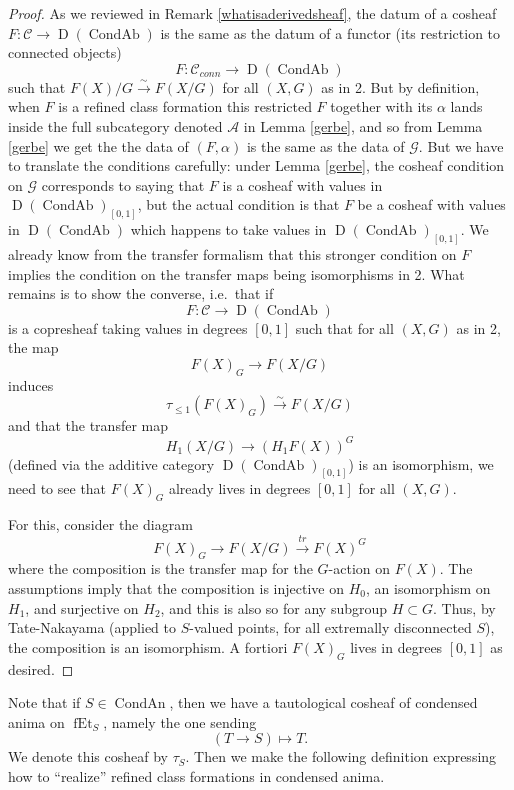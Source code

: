 \documentclass[12pt]{article}
\theoremstyle{definition}
\newcommand{\on}{\operatorname}
\newcommand{\mc}{\mathcal}
\begin{document}
\begin{proof}
As we reviewed in Remark \ref{whatisaderivedsheaf}, the datum of a cosheaf $F:\mc{C} \to \on{D}(\on{CondAb})$ is the same as the datum of a functor (its restriction to connected objects)
$$F:\mc{C}_{conn} \to \on{D}(\on{CondAb})$$
such that $F(X)/G\overset{\sim}{\rightarrow} F(X/G)$ for all $(X,G)$ as in 2.  But by definition, when $F$ is a refined class formation this restricted $F$ together with its $\alpha$ lands inside the full subcategory denoted $\mc{A}$ in Lemma \ref{gerbe}, and so from Lemma \ref{gerbe} we get the the data of $(F,\alpha)$ is the same as the data of $\mc{G}$.  But we have to translate the conditions carefully: under Lemma \ref{gerbe}, the cosheaf condition on $\mc{G}$ corresponds to saying that $F$ is a cosheaf with values in $\on{D}(\on{CondAb})_{[0,1]}$, but the actual condition is that $F$ be a cosheaf with values in $\on{D}(\on{CondAb})$ which happens to take values in $\on{D}(\on{CondAb})_{[0,1]}$.  We already know from the transfer formalism that this stronger condition on $F$ implies the condition on the transfer maps being isomorphisms in 2.  What remains is to show the converse, i.e.\ that if
$$F:\mc{C}\to \on{D}(\on{CondAb})$$
is a copresheaf taking values in degrees $[0,1]$ such that for all $(X,G)$ as in 2, the map
$$F(X)_G \to F(X/G)$$
induces
$$\tau_{\leq 1}(F(X)_G)\overset{\sim}{\rightarrow} F(X/G)$$
and that the transfer map
$$H_1(X/G) \to (H_1F(X))^G$$
(defined via the additive category $\on{D}(\on{CondAb})_{[0,1]}$) is an isomorphism, we need to see that $F(X)_G$ already lives in degrees $[0,1]$ for all $(X,G)$.

For this, consider the diagram
$$F(X)_G \to F(X/G) \overset{tr}{\rightarrow} F(X)^G$$
where the composition is the transfer map for the $G$-action on $F(X)$.  The assumptions imply that the composition is injective on $H_0$, an isomorphism on $H_1$, and surjective on $H_2$, and this is also so for any subgroup $H\subset G$.  Thus, by Tate-Nakayama (applied to $S$-valued points, for all extremally disconnected $S$), the composition is an isomorphism.  A fortiori $F(X)_G$ lives in degrees $[0,1]$ as desired.
\end{proof}
 
Note that if $S\in\on{CondAn}$, then we have a tautological cosheaf of condensed anima on $\on{fEt}_S$, namely the one sending
$$(T\to S) \mapsto T.$$
We denote this cosheaf by $\tau_S$.  Then we make the following definition expressing how to ``realize'' refined class formations in condensed anima.
\end{document}
